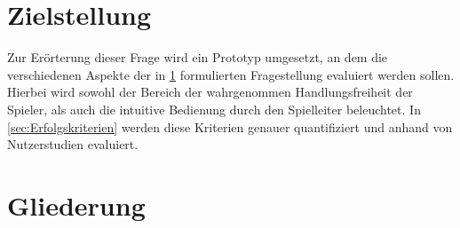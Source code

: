 \section{Zielstellung}
\label{sec:Zielstellung}

Zur Erörterung dieser Frage wird ein Prototyp umgesetzt, an dem die verschiedenen Aspekte der in \ref{sec:Zielstellung} formulierten Fragestellung evaluiert werden sollen. Hierbei wird sowohl der Bereich der wahrgenommen Handlungsfreiheit der Spieler, als auch die intuitive Bedienung durch den Spielleiter beleuchtet. In \ref{sec:Erfolgskriterien} werden diese Kriterien genauer quantifiziert und anhand von Nutzerstudien evaluiert.

\section{Gliederung}
\label{sec:Gliederung}

